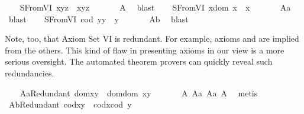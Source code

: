 \begin{isabellebody}
{\isafoldproof}%
%
\isadelimproof
\isanewline
%
\endisadelimproof
\ \ \isamarkupfalse%
\ S{}FromVI{\isacharcolon}\ {\isachardoublequoteopen}x{\isasymcdot}{\isacharparenleft}y{\isasymcdot}z{\isacharparenright}\ {\isasymcong}\ {\isacharparenleft}x{\isasymcdot}y{\isacharparenright}{\isasymcdot}z{\isachardoublequoteclose}\ \isanewline
%
\isadelimproof
\ \ \ \ %
\endisadelimproof
%
\isatagproof
{}\isamarkupfalse%
\ A{}\ \isamarkupfalse%
\ blast%
\endisatagproof
{\isafoldproof}%
%
\isadelimproof
\isanewline
%
\endisadelimproof
\ \ \isamarkupfalse%
\ S{}FromVI{\isacharcolon}\ {\isachardoublequoteopen}x{\isasymcdot}{\isacharparenleft}dom\ x{\isacharparenright}\ {\isasymcong}\ x{\isachardoublequoteclose}\ \isanewline
%
\isadelimproof
\ \ \ \ %
\endisadelimproof
%
\isatagproof
{}\isamarkupfalse%
\ A{}a\ \isamarkupfalse%
\ blast%
\endisatagproof
{\isafoldproof}%
%
\isadelimproof
\isanewline
%
\endisadelimproof
\ \ \isamarkupfalse%
\ S{}FromVI{\isacharcolon}\ {\isachardoublequoteopen}{\isacharparenleft}cod\ y{\isacharparenright}{\isasymcdot}y\ {\isasymcong}\ y{\isachardoublequoteclose}\ \isanewline
%
\isadelimproof
\ \ \ \ %
\endisadelimproof
%
\isatagproof
{}\isamarkupfalse%
\ A{}b\ \isamarkupfalse%
\ blast%
\endisatagproof
{\isafoldproof}%
%
\isadelimproof
%
\endisadelimproof
%
\begin{isamarkuptext}%
Note, too, that Axiom Set VI is redundant. For example, axioms  and  are
  implied from the others. This kind of flaw in presenting axioms in our view is a more serious oversight.
  The automated theorem provers can quickly reveal such redundancies.%
\end{isamarkuptext}\isamarkuptrue%
\ \ \isamarkupfalse%
\ A{}aRedundant{\isacharcolon}\ {\isachardoublequoteopen}dom{\isacharparenleft}x{\isasymcdot}y{\isacharparenright}\ {\isasymcong}\ dom{\isacharparenleft}{\isacharparenleft}dom\ x{\isacharparenright}{\isasymcdot}y{\isacharparenright}{\isachardoublequoteclose}\ \isanewline
%
\isadelimproof
\ \ \ \ %
\endisadelimproof
%
\isatagproof
{}\isamarkupfalse%
\ A{}\ A{}a\ A{}a\ A{}\ \isamarkupfalse%
\ metis%
\endisatagproof
{\isafoldproof}%
%
\isadelimproof
\isanewline
%
\endisadelimproof
\ \ \isamarkupfalse%
\ A{}bRedundant{\isacharcolon}\ {\isachardoublequoteopen}cod{\isacharparenleft}x{\isasymcdot}y{\isacharparenright}\ {\isasymcong}\ cod{\isacharparenleft}x{\isasymcdot}{\isacharparenleft}cod\ y{\isacharparenright}{\isacharparenright}{\isachardoublequoteclose}\ \ \isanewline

\end{isabellebody}
